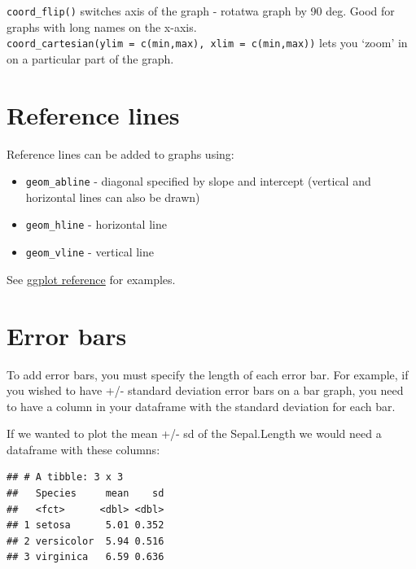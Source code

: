 \documentclass[]{book}
\newenvironment{Shaded}{\begin{snugshade}}{\end{snugshade}}
\newcommand{\KeywordTok}[1]{\textcolor[rgb]{0.13,0.29,0.53}{\textbf{#1}}}
\newcommand{\DataTypeTok}[1]{\textcolor[rgb]{0.13,0.29,0.53}{#1}}
\newcommand{\StringTok}[1]{\textcolor[rgb]{0.31,0.60,0.02}{#1}}
\newcommand{\OperatorTok}[1]{\textcolor[rgb]{0.81,0.36,0.00}{\textbf{#1}}}
\newcommand{\NormalTok}[1]{#1}
\providecommand{\tightlist}{%
  \setlength{\itemsep}{0pt}\setlength{\parskip}{0pt}}
\begin{document}
\texttt{coord\_flip()} switches axis of the graph - rotatwa graph by 90
deg. Good for graphs with long names on the x-axis.
\texttt{coord\_cartesian(ylim\ =\ c(min,max),\ xlim\ =\ c(min,max))}
lets you `zoom' in on a particular part of the graph.

\section{Reference lines}\label{reference-lines}

Reference lines can be added to graphs using:

\begin{itemize}
\tightlist
\item
  \texttt{geom\_abline} - diagonal specified by slope and intercept
  (vertical and horizontal lines can also be drawn)
\item
  \texttt{geom\_hline} - horizontal line
\item
  \texttt{geom\_vline} - vertical line
\end{itemize}

See
\href{https://ggplot2.tidyverse.org/reference/geom_abline.html}{ggplot
reference} for examples.

\section{Error bars}\label{error-bars}

To add error bars, you must specify the length of each error bar. For
example, if you wished to have +/- standard deviation error bars on a
bar graph, you need to have a column in your dataframe with the standard
deviation for each bar.

If we wanted to plot the mean +/- sd of the Sepal.Length we would need a
dataframe with these columns:

\begin{Shaded}
\end{Shaded}

\begin{verbatim}
## # A tibble: 3 x 3
##   Species     mean    sd
##   <fct>      <dbl> <dbl>
## 1 setosa      5.01 0.352
## 2 versicolor  5.94 0.516
## 3 virginica   6.59 0.636
\end{verbatim}
\end{document}
